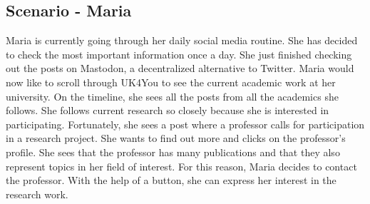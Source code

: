 \subsection{Scenario - Maria}
Maria is currently going through her daily social media routine.
She has decided to check the most important information once a day.
She just finished checking out the posts on Mastodon, a decentralized alternative to Twitter.
Maria would now like to scroll through UK4You to see the current academic work at her university.
On the timeline, she sees all the posts from all the academics she follows.
She follows current research so closely because she is interested in participating.
Fortunately, she sees a post where a professor calls for participation in a research project.
She wants to find out more and clicks on the professor's profile.
She sees that the professor has many publications and that they also represent topics in her field of interest.
For this reason, Maria decides to contact the professor.
With the help of a button, she can express her interest in the research work.


